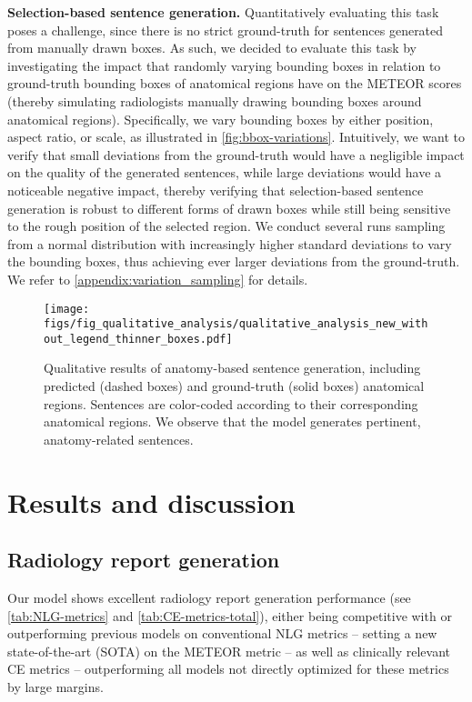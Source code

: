\documentclass[10pt,twocolumn,letterpaper]{article}
\begin{document}
\noindent\textbf{Selection-based sentence generation.} Quantitatively evaluating this task poses a challenge, since there is no strict ground-truth for sentences generated from manually drawn boxes. As such, we decided to evaluate this task by investigating the impact that randomly varying bounding boxes in relation to ground-truth bounding boxes of anatomical regions have on the METEOR scores (thereby simulating radiologists manually drawing bounding boxes around anatomical regions). Specifically, we vary bounding boxes by either position, aspect ratio, or scale, as illustrated in \cref{fig:bbox-variations}. Intuitively, we want to verify that small deviations from the ground-truth would have a negligible impact on the quality of the generated sentences, while large deviations would have a noticeable negative impact, thereby verifying that selection-based sentence generation is robust to different forms of drawn boxes while still being sensitive to the rough position of the selected region. We conduct several runs sampling from a normal distribution with increasingly higher standard deviations to vary the bounding boxes, thus achieving ever larger deviations from the ground-truth. We refer to \cref{appendix:variation_sampling} for details.

\begin{figure}[t!]
  \centering
   \texttt{[image: figs/fig\_qualitative\_analysis/qualitative\_analysis\_new\_without\_legend\_thinner\_boxes.pdf]}
   \caption{Qualitative results of anatomy-based sentence generation, including predicted (dashed boxes) and ground-truth (solid boxes) anatomical regions. Sentences are color-coded according to their corresponding anatomical regions. We observe that the model generates pertinent, anatomy-related sentences.}
   \label{fig:qualitative-analysis}
\end{figure}

\section{Results and discussion}

\subsection{Radiology report generation}

Our model shows excellent radiology report generation performance (see \cref{tab:NLG-metrics} and \cref{tab:CE-metrics-total}), either being competitive with or outperforming previous models on conventional NLG metrics -- setting a new state-of-the-art (SOTA) on the METEOR metric -- as well as clinically relevant CE metrics -- outperforming all models not directly optimized for these metrics by large margins.
\end{document}
